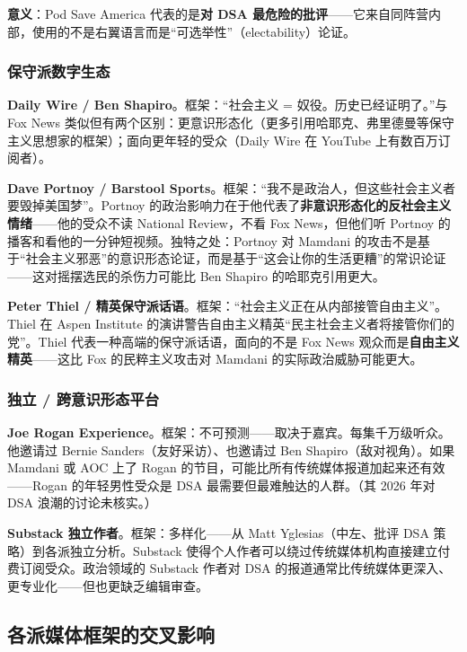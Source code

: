 \documentclass[12pt,a4paper]{ctexart}
\begin{document}
\textbf{意义}：Pod Save America 代表的是\textbf{对 DSA 最危险的批评}——它来自同阵营内部，使用的不是右翼语言而是``可选举性''（electability）论证。

\subsubsection{保守派数字生态}

\textbf{Daily Wire / Ben Shapiro}。框架：``社会主义 = 奴役。历史已经证明了。''与 Fox News 类似但有两个区别：更意识形态化（更多引用哈耶克、弗里德曼等保守主义思想家的框架）；面向更年轻的受众（Daily Wire 在 YouTube 上有数百万订阅者）。

\textbf{Dave Portnoy / Barstool Sports}。框架：``我不是政治人，但这些社会主义者要毁掉美国梦''。Portnoy 的政治影响力在于他代表了\textbf{非意识形态化的反社会主义情绪}——他的受众不读 National Review，不看 Fox News，但他们听 Portnoy 的播客和看他的一分钟短视频。独特之处：Portnoy 对 Mamdani 的攻击不是基于``社会主义邪恶''的意识形态论证，而是基于``这会让你的生活更糟''的常识论证——这对摇摆选民的杀伤力可能比 Ben Shapiro 的哈耶克引用更大。

\textbf{Peter Thiel / 精英保守派话语}。框架：``社会主义正在从内部接管自由主义''。Thiel 在 Aspen Institute 的演讲警告自由主义精英``民主社会主义者将接管你们的党''。Thiel 代表一种高端的保守派话语，面向的不是 Fox News 观众而是\textbf{自由主义精英}——这比 Fox 的民粹主义攻击对 Mamdani 的实际政治威胁可能更大。

\subsubsection{独立 / 跨意识形态平台}

\textbf{Joe Rogan Experience}。框架：不可预测——取决于嘉宾。每集千万级听众。他邀请过 Bernie Sanders（友好采访）、也邀请过 Ben Shapiro（敌对视角）。如果 Mamdani 或 AOC 上了 Rogan 的节目，可能比所有传统媒体报道加起来还有效——Rogan 的年轻男性受众是 DSA 最需要但最难触达的人群。（其 2026 年对 DSA 浪潮的讨论未核实。）

\textbf{Substack 独立作者}。框架：多样化——从 Matt Yglesias（中左、批评 DSA 策略）到各派独立分析。Substack 使得个人作者可以绕过传统媒体机构直接建立付费订阅受众。政治领域的 Substack 作者对 DSA 的报道通常比传统媒体更深入、更专业化——但也更缺乏编辑审查。

\subsection{各派媒体框架的交叉影响}
\end{document}
